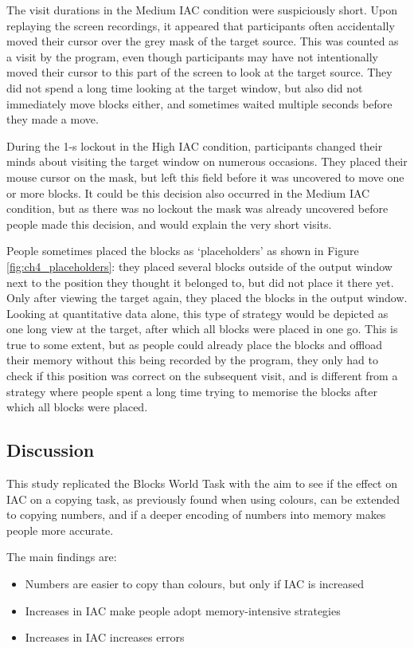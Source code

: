 \documentclass[11pt,oneside]{report}
\begin{document}
\begin{table}
The visit durations in the Medium IAC condition were suspiciously short. Upon replaying the screen recordings, it appeared that participants often accidentally moved their cursor over the grey mask of the target source. This was counted as a visit by the program, even though participants may have not intentionally moved their cursor to this part of the screen to look at the target source. They did not spend a long time looking at the target window, but also did not immediately move blocks either, and sometimes waited multiple seconds before they made a move. 

During the 1-s lockout in the High IAC condition, participants changed their minds about visiting the target window on numerous occasions. They placed their mouse cursor on the mask, but left this field before it was uncovered to move one or more blocks. It could be this decision also occurred in the Medium IAC condition, but as there was no lockout the mask was already uncovered before people made this decision, and would explain the very short visits.

People sometimes placed the blocks as `placeholders' as shown in Figure \ref{fig:ch4_placeholders}: they placed several blocks outside of the output window next to the position they thought it belonged to, but did not place it there yet. Only after viewing the target again, they placed the blocks in the output window. Looking at quantitative data alone, this type of strategy would be depicted as one long view at the target, after which all blocks were placed in one go. This is true to some extent, but as people could already place the blocks and offload their memory without this being recorded by the program, they only had to check if this position was correct on the subsequent visit, and is different from a strategy where people spent a long time trying to memorise the blocks after which all blocks were placed.

\subsection{Discussion}
This study replicated the Blocks World Task with the aim to see if the effect on IAC on a copying task, as previously found when using colours, can be extended to copying numbers, and if a deeper encoding of numbers into memory makes people more accurate.

The main findings are:

\begin{itemize}
\item
Numbers are easier to copy than colours, but only if IAC is increased
\item
Increases in IAC make people adopt memory-intensive strategies
\item
Increases in IAC increases errors
\end{itemize}


\end{table}
\end{document}
